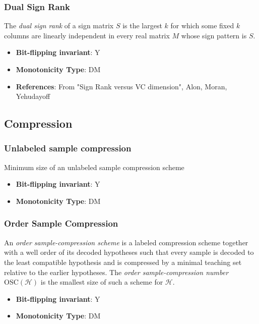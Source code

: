 \subsubsection{Dual Sign Rank}
      
      \begin{definition}\label{def:dual_sign_rank}
      The \emph{dual sign rank} of a sign matrix $S$ is the largest $k$ for which some fixed $k$ columns are linearly independent in every real matrix $M$ whose sign pattern is $S$.
      \end{definition}
      \begin{itemize}
      \item {\bf Bit-flipping invariant}: Y
      \item {\bf Monotonicity Type}: DM
      \item {\bf References}: From "Sign Rank versus VC dimension", Alon, Moran, Yehudayoff
\end{itemize}
\subsection{Compression}\label{sec:Compression}
\subsubsection{Unlabeled sample compression}
      Minimum size of an unlabeled sample compression scheme
      \begin{definition}\label{def:unlabeled_sample_compression}
      
      \end{definition}
      \begin{itemize}
      \item {\bf Bit-flipping invariant}: Y
      \item {\bf Monotonicity Type}: DM
      \end{itemize}
\subsubsection{Order Sample Compression}
      
      \begin{definition}\label{def:order_sample_compression}
      An \emph{order sample-compression scheme} is a labeled compression
      scheme together with a well order of its decoded hypotheses such that
      every sample is decoded to the least compatible hypothesis and is
      compressed by a minimal teaching set relative to the earlier hypotheses.
      The \emph{order sample-compression number} $\mathrm{OSC}(\mathcal H)$
      is the smallest size of such a scheme for $\mathcal H$.
      \end{definition}
      \begin{itemize}
      \item {\bf Bit-flipping invariant}: Y
      \item {\bf Monotonicity Type}: DM
      \end{itemize}
